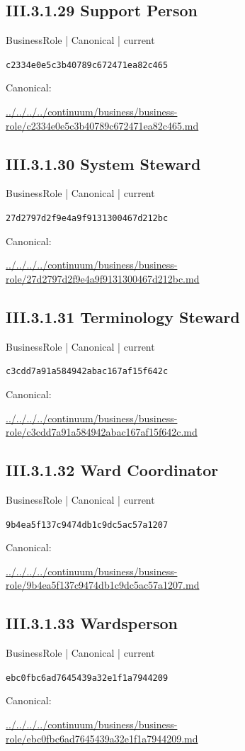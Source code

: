\documentclass[10pt,a4paper]{article}
\begin{document}
\subsection*{III.3.1.29 Support Person}
\label{element-c2334e0e5c3b40789c672471ea82c465}
{\small BusinessRole | Canonical | current}\par
\texttt{c2334e0e5c3b40789c672471ea82c465}\par
Canonical: \par
{\footnotesize\url{../../../../continuum/business/business-role/c2334e0e5c3b40789c672471ea82c465.md}}\par
\subsection*{III.3.1.30 System Steward}
\label{element-27d2797d2f9e4a9f9131300467d212bc}
{\small BusinessRole | Canonical | current}\par
\texttt{27d2797d2f9e4a9f9131300467d212bc}\par
Canonical: \par
{\footnotesize\url{../../../../continuum/business/business-role/27d2797d2f9e4a9f9131300467d212bc.md}}\par
\subsection*{III.3.1.31 Terminology Steward}
\label{element-c3cdd7a91a584942abac167af15f642c}
{\small BusinessRole | Canonical | current}\par
\texttt{c3cdd7a91a584942abac167af15f642c}\par
Canonical: \par
{\footnotesize\url{../../../../continuum/business/business-role/c3cdd7a91a584942abac167af15f642c.md}}\par
\subsection*{III.3.1.32 Ward Coordinator}
\label{element-9b4ea5f137c9474db1c9dc5ac57a1207}
{\small BusinessRole | Canonical | current}\par
\texttt{9b4ea5f137c9474db1c9dc5ac57a1207}\par
Canonical: \par
{\footnotesize\url{../../../../continuum/business/business-role/9b4ea5f137c9474db1c9dc5ac57a1207.md}}\par
\subsection*{III.3.1.33 Wardsperson}
\label{element-ebc0fbc6ad7645439a32e1f1a7944209}
{\small BusinessRole | Canonical | current}\par
\texttt{ebc0fbc6ad7645439a32e1f1a7944209}\par
Canonical: \par
{\footnotesize\url{../../../../continuum/business/business-role/ebc0fbc6ad7645439a32e1f1a7944209.md}}\par
\end{document}
